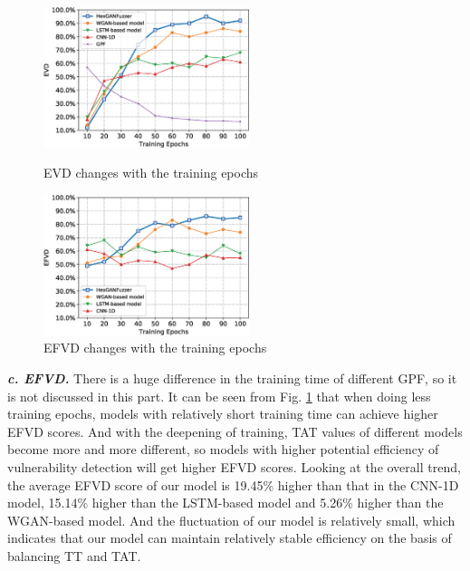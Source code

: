\begin{figure}[t]
	\centering
	\begin{minipage}[t]{0.48\textwidth}
		\centering
		\includegraphics[width=6cm]{Figure/FIGURE_EVD.eps}
		\caption{EVD changes with the training epochs}
		\label{FIGURE_EVD}
	\end{minipage}
	\begin{minipage}[t]{0.48\textwidth}
		\centering
		\includegraphics[width=6cm]{Figure/FIGURE_EFVD.eps}
		\caption{EFVD changes with the training epochs}
		\label{FIGURE_EFVD}
	\end{minipage}
\end{figure}
\textit{\textbf{c. EFVD.}}
There is a huge difference in the training time of different GPF, so it is not discussed in this part. It can be seen from Fig. \ref{FIGURE_EFVD} that when doing less training epochs, models with relatively short training time can achieve higher EFVD scores. And with the deepening of training, TAT values of different models become more and more different, so models with higher potential efficiency of vulnerability detection will get higher EFVD scores. Looking at the overall trend, the average EFVD score of our model is 19.45\% higher than that in the CNN-1D model, 15.14\% higher than the LSTM-based model and 5.26\% higher than the WGAN-based model. And the fluctuation of our model is relatively small, which indicates that our model can maintain relatively stable efficiency on the basis of balancing TT and TAT.

